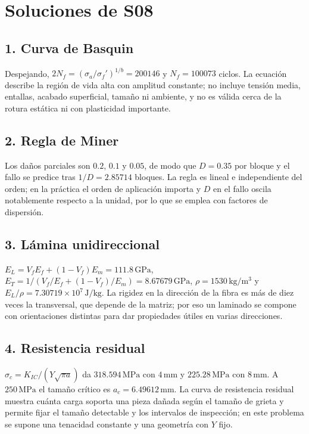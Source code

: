 

\chapter{Soluciones de S08}
\section{1. Curva de Basquin}
Despejando, $2N_f=(\sigma_a/\sigma_f')^{1/b}=200146$ y $N_f=100073$ ciclos. La ecuación describe la región de vida alta con amplitud constante; no incluye tensión media, entallas, acabado superficial, tamaño ni ambiente, y no es válida cerca de la rotura estática ni con plasticidad importante.

\section{2. Regla de Miner}
Los daños parciales son $0.2$, $0.1$ y $0.05$, de modo que $D=0.35$ por bloque y el fallo se predice tras $1/D=2.85714$ bloques. La regla es lineal e independiente del orden; en la práctica el orden de aplicación importa y $D$ en el fallo oscila notablemente respecto a la unidad, por lo que se emplea con factores de dispersión.

\section{3. Lámina unidireccional}
$E_L=V_fE_f+(1-V_f)E_m=111.8\,\mathrm{GPa}$, $E_T=1/(V_f/E_f+(1-V_f)/E_m)=8.67679\,\mathrm{GPa}$, $\rho=1530\,\mathrm{kg/m^3}$ y $E_L/\rho=7.30719\times10^{7}\,\mathrm{J/kg}$. La rigidez en la dirección de la fibra es más de diez veces la transversal, que depende de la matriz; por eso un laminado se compone con orientaciones distintas para dar propiedades útiles en varias direcciones.

\section{4. Resistencia residual}
$\sigma_c=K_{IC}/(Y\sqrt{\pi a})$ da $318.594\,\mathrm{MPa}$ con $4\,\mathrm{mm}$ y $225.28\,\mathrm{MPa}$ con $8\,\mathrm{mm}$. A $250\,\mathrm{MPa}$ el tamaño crítico es $a_c=6.49612\,\mathrm{mm}$. La curva de resistencia residual muestra cuánta carga soporta una pieza dañada según el tamaño de grieta y permite fijar el tamaño detectable y los intervalos de inspección; en este problema se supone una tenacidad constante y una geometría con $Y$ fijo.

